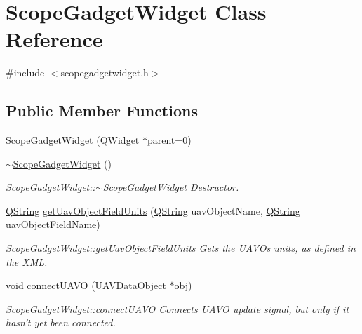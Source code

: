 \hypertarget{class_scope_gadget_widget}{\section{\-Scope\-Gadget\-Widget \-Class \-Reference}
\label{class_scope_gadget_widget}
}


{\ttfamily \#include $<$scopegadgetwidget.\-h$>$}

\subsection*{\-Public \-Member \-Functions}
\begin{DoxyCompactItemize}
\item 
\hyperlink{group___scope_plugin_ga2810fbb794c4531b885259a5100bcf79}{\-Scope\-Gadget\-Widget} (\-Q\-Widget $\ast$parent=0)
\item 
\hyperlink{group___scope_plugin_gaa4f8465d4475c6035056db0bb194b9fa}{$\sim$\-Scope\-Gadget\-Widget} ()
\begin{DoxyCompactList}\small\item\em \hyperlink{group___scope_plugin_gaa4f8465d4475c6035056db0bb194b9fa}{\-Scope\-Gadget\-Widget\-::$\sim$\-Scope\-Gadget\-Widget} \-Destructor. \end{DoxyCompactList}\item 
\hyperlink{group___u_a_v_objects_plugin_gab9d252f49c333c94a72f97ce3105a32d}{\-Q\-String} \hyperlink{group___scope_plugin_ga4fc130c09e788ead2fe9da284efb780b}{get\-Uav\-Object\-Field\-Units} (\hyperlink{group___u_a_v_objects_plugin_gab9d252f49c333c94a72f97ce3105a32d}{\-Q\-String} uav\-Object\-Name, \hyperlink{group___u_a_v_objects_plugin_gab9d252f49c333c94a72f97ce3105a32d}{\-Q\-String} uav\-Object\-Field\-Name)
\begin{DoxyCompactList}\small\item\em \hyperlink{group___scope_plugin_ga4fc130c09e788ead2fe9da284efb780b}{\-Scope\-Gadget\-Widget\-::get\-Uav\-Object\-Field\-Units} \-Gets the \-U\-A\-V\-Os units, as defined in the \-X\-M\-L. \end{DoxyCompactList}\item 
\hyperlink{group___u_a_v_objects_plugin_ga444cf2ff3f0ecbe028adce838d373f5c}{void} \hyperlink{group___scope_plugin_gae48ddd25c6bea599893a60ab02c375bf}{connect\-U\-A\-V\-O} (\hyperlink{class_u_a_v_data_object}{\-U\-A\-V\-Data\-Object} $\ast$obj)
\begin{DoxyCompactList}\small\item\em \hyperlink{group___scope_plugin_gae48ddd25c6bea599893a60ab02c375bf}{\-Scope\-Gadget\-Widget\-::connect\-U\-A\-V\-O} \-Connects \-U\-A\-V\-O update signal, but only if it hasn't yet been connected. \end{DoxyCompactList}\item 

\end{DoxyCompactItemize}
